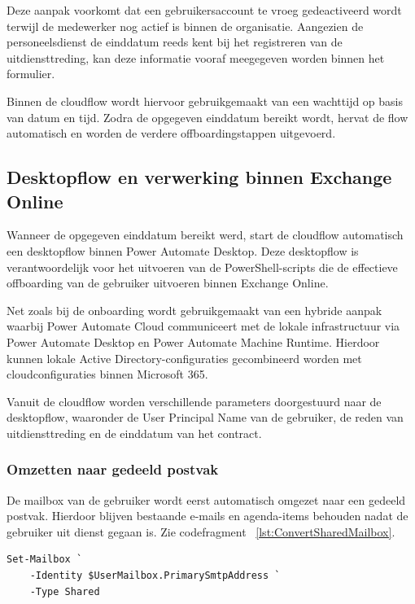 Deze aanpak voorkomt dat een gebruikersaccount te vroeg gedeactiveerd wordt terwijl de medewerker nog actief is binnen de organisatie. Aangezien de personeelsdienst de einddatum reeds kent bij het registreren van de uitdiensttreding, kan deze informatie vooraf meegegeven worden binnen het formulier.

Binnen de cloudflow wordt hiervoor gebruikgemaakt van een wachttijd op basis van datum en tijd. Zodra de opgegeven einddatum bereikt wordt, hervat de flow automatisch en worden de verdere offboardingstappen uitgevoerd.

\subsection{Desktopflow en verwerking binnen Exchange Online}

Wanneer de opgegeven einddatum bereikt werd, start de cloudflow automatisch een desktopflow binnen Power Automate Desktop. Deze desktopflow is verantwoordelijk voor het uitvoeren van de PowerShell-scripts die de effectieve offboarding van de gebruiker uitvoeren binnen Exchange Online.

Net zoals bij de onboarding wordt gebruikgemaakt van een hybride aanpak waarbij Power Automate Cloud communiceert met de lokale infrastructuur via Power Automate Desktop en Power Automate Machine Runtime. Hierdoor kunnen lokale Active Directory-configuraties gecombineerd worden met cloudconfiguraties binnen Microsoft 365.

Vanuit de cloudflow worden verschillende parameters doorgestuurd naar de desk\-top\-flow, waaronder de User Principal Name van de gebruiker, de reden van uitdiensttreding en de einddatum van het contract.

\subsubsection{Omzetten naar gedeeld postvak}

De mailbox van de gebruiker wordt eerst automatisch omgezet naar een gedeeld postvak. Hierdoor blijven bestaande e-mails en agenda-items behouden nadat de gebruiker uit dienst gegaan is. Zie codefragment ~\ref{lst:ConvertSharedMailbox}.

\begin{listing}[ht]
\begin{verbatim}
Set-Mailbox `
    -Identity $UserMailbox.PrimarySmtpAddress `
    -Type Shared
\end{verbatim}
\caption{Omzetten naar gedeeld postvak}
\label{lst:ConvertSharedMailbox}
\end{listing}

